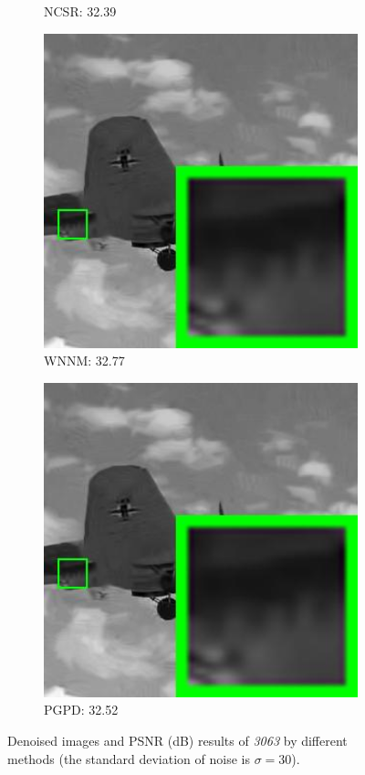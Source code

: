 \begin{figure}
\begin{subfigure}[t]{0.24\textwidth}
		\caption{NCSR: 32.39}
    \end{subfigure}
    \hfill
    \begin{subfigure}[t]{0.24\textwidth}
        \centering
        \includegraphics[width=1\textwidth]{images/pgpd/200img/br_our_30_3063.jpg}
		\caption{WNNM: 32.77}
    \end{subfigure}
    \hfill
    \begin{subfigure}[t]{0.24\textwidth}
        \centering
        \includegraphics[width=1\textwidth]{images/pgpd/200img/br_our_30_3063.jpg}
		\caption{PGPD: 32.52}
    \end{subfigure}
    \caption{Denoised images and PSNR (dB) results of \textsl{3063} by different methods (the standard deviation of noise is $\sigma=30$).}
    \label{fig2-14}
\end{figure}


